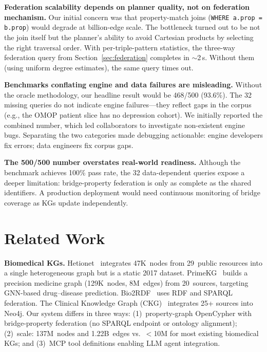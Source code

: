 \documentclass[runningheads]{llncs}
\begin{document}
\noindent\textbf{Federation scalability depends on planner quality,
not on federation mechanism.}
Our initial concern was that property-match joins
(\texttt{WHERE a.prop = b.prop}) would degrade at billion-edge
scale.  The bottleneck turned out to be not the join itself but the
planner's ability to avoid Cartesian products by selecting the
right traversal order.  With per-triple-pattern statistics, the
three-way federation query from Section~\ref{sec:federation}
completes in ${\sim}$2\,s.  Without them (using uniform degree
estimates), the same query times out.

\smallskip\noindent\textbf{Benchmarks conflating engine and data failures are misleading.}
Without the oracle methodology, our headline result would be
468/500 (93.6\%).  The 32 missing queries do not indicate engine
failures---they reflect gaps in the corpus (e.g., the OMOP patient
slice has no depression cohort).  We initially reported the
combined number, which led collaborators to investigate
non-existent engine bugs.  Separating the two categories made
debugging actionable: engine developers fix errors; data engineers
fix corpus gaps.

\smallskip\noindent\textbf{The 500/500 number overstates real-world readiness.}
Although the benchmark achieves 100\% pass rate, the 32
data-dependent queries expose a deeper limitation: bridge-property
federation is only as complete as the shared identifiers.  A
production deployment would need continuous monitoring of bridge
coverage as KGs update independently.

\section{Related Work}\label{sec:related}

\textbf{Biomedical KGs.}
Hetionet~\cite{himmelstein2017hetionet} integrates 47K~nodes from
29~public resources into a single heterogeneous graph but is a
static 2017 dataset.
PrimeKG~\cite{chandak2023primekg} builds a precision medicine
graph (129K~nodes, 8M~edges) from 20~sources, targeting GNN-based
drug--disease prediction.
Bio2RDF~\cite{dumontier2014bio2rdf} uses RDF and SPARQL federation.
The Clinical Knowledge Graph (CKG)~\cite{santos2022ckg} integrates
25+ sources into Neo4j.
Our system differs in three ways:
(1)~property-graph OpenCypher with bridge-property federation
(no SPARQL endpoint or ontology alignment);
(2)~scale: 137M~nodes and 1.22B~edges vs.\ $<$10M for most
existing biomedical KGs; and
(3)~MCP tool definitions enabling LLM agent integration.
\end{document}
